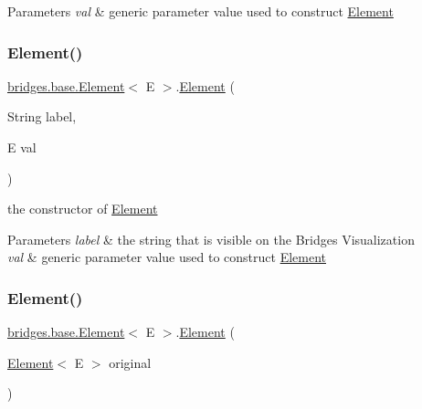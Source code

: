 \begin{DoxyParams}{Parameters}
{\em val} & generic parameter value used to construct \mbox{\hyperlink{classbridges_1_1base_1_1_element}{Element}} \\
\hline
\end{DoxyParams}
\mbox{\label{classbridges_1_1base_1_1_element_a14e857e8050eac518900a458f0364d8e}} 
\subsubsection{\texorpdfstring{Element()}{Element()}\hspace{0.1cm}{\footnotesize\ttfamily [3/4]}}
{\footnotesize\ttfamily \mbox{\hyperlink{classbridges_1_1base_1_1_element}{bridges.\+base.\+Element}}$<$ E $>$.\mbox{\hyperlink{classbridges_1_1base_1_1_element}{Element}} (\begin{DoxyParamCaption}\item[{String}]{label,  }\item[{E}]{val }\end{DoxyParamCaption})}

the constructor of \mbox{\hyperlink{classbridges_1_1base_1_1_element}{Element}} 
\begin{DoxyParams}{Parameters}
{\em label} & the string that is visible on the Bridges Visualization \\
\hline
{\em val} & generic parameter value used to construct \mbox{\hyperlink{classbridges_1_1base_1_1_element}{Element}} \\
\hline
\end{DoxyParams}
\mbox{\label{classbridges_1_1base_1_1_element_a91db9de70b65a1d7b5f27c1c0b909832}} 
\subsubsection{\texorpdfstring{Element()}{Element()}\hspace{0.1cm}{\footnotesize\ttfamily [4/4]}}
{\footnotesize\ttfamily \mbox{\hyperlink{classbridges_1_1base_1_1_element}{bridges.\+base.\+Element}}$<$ E $>$.\mbox{\hyperlink{classbridges_1_1base_1_1_element}{Element}} (\begin{DoxyParamCaption}\item[{\mbox{\hyperlink{classbridges_1_1base_1_1_element}{Element}}$<$ E $>$}]{original }\end{DoxyParamCaption})}

